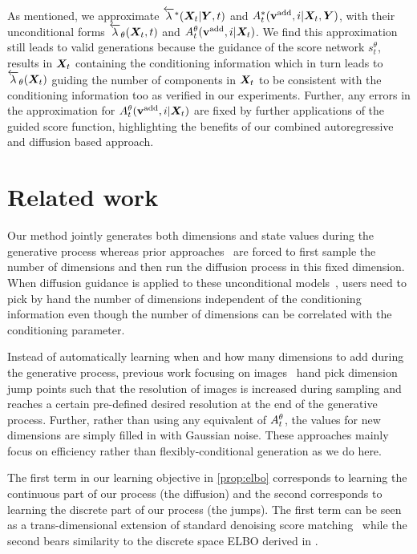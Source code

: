 As mentioned, we approximate $\overleftarrow{\lambda}^*({\bm{X}}_t | {\bm{Y}}, t)$ and $A_t^*({\mathbf{v}}^{\textup{add}}, i | {\bm{X}}_t, {\bm{Y}})$, with their unconditional forms $\overleftarrow{\lambda}_\theta({\bm{X}}_t, t)$ and $A_t^\theta({\mathbf{v}}^{\textup{add}}, i | {\bm{X}}_t)$. We find this approximation still leads to valid generations because the guidance of the score network $s_t^\theta$, results in ${\bm{X}}_t$ containing the conditioning information which in turn leads to $\overleftarrow{\lambda}_\theta({\bm{X}}_t)$ guiding the number of components in ${\bm{X}}_t$ to be consistent with the conditioning information too as verified in our experiments. Further, any errors in the approximation for $A_t^\theta({\mathbf{v}}^{\textup{add}}, i | {\bm{X}}_t)$ are fixed by further applications of the guided score function, highlighting the benefits of our combined autoregressive and diffusion based approach.



\section{Related work}

Our method jointly generates both dimensions and state values during the generative process whereas prior approaches~\citep{hoogeboom2022equivariant, igashov2022equivariant} are forced to first sample the number of dimensions and then run the diffusion process in this fixed dimension. When diffusion guidance is applied to these unconditional models~\citep{weiss2023guided, zhang2023towards}, users need to pick by hand the number of dimensions independent of the conditioning information even though the number of dimensions can be correlated with the conditioning parameter.

Instead of automatically learning when and how many dimensions to add during the generative process, previous work focusing on images~\citep{jing2022subspace, zhang2022dimensionality} hand pick dimension jump points such that the resolution of images is increased during sampling and reaches a certain pre-defined desired resolution at the end of the generative process. Further, rather than using any equivalent of $A_t^\theta$, the values for new dimensions are simply filled in with Gaussian noise. These approaches mainly focus on efficiency rather than flexibly-conditional generation as we do here.

The first term in our learning objective in \cref{prop:elbo} corresponds to learning the continuous part of our process (the diffusion) and the second corresponds to learning the discrete part of our process (the jumps). The first term can be seen as a trans-dimensional extension of standard denoising score matching~\citep{vincent2011connection} while the second bears similarity to the discrete space ELBO derived in \citet{campbell2022continuous}.

